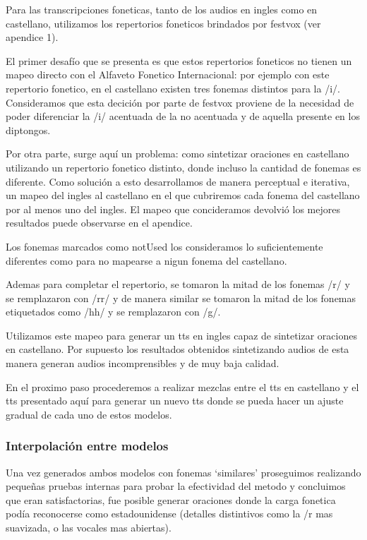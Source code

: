 
Para las transcripciones foneticas, tanto de los audios en ingles como en castellano, utilizamos los repertorios foneticos brindados por festvox (ver apendice 1).

El primer desafío que se presenta es que estos repertorios foneticos no tienen un mapeo directo con el Alfaveto Fonetico Internacional: por ejemplo con este repertorio fonetico, en el castellano existen tres fonemas distintos para la /i/. Consideramos que esta decición por parte de festvox proviene de la necesidad de poder diferenciar la /i/ acentuada de la no acentuada y de aquella presente en los diptongos. 

Por otra parte, surge aquí un problema: como sintetizar oraciones en castellano utilizando un repertorio fonetico distinto, donde incluso la cantidad de fonemas es diferente. Como solución a esto desarrollamos de manera perceptual e iterativa, un mapeo del ingles al castellano en el que cubriremos cada fonema del castellano por al menos uno del ingles. El mapeo que concideramos devolvió los mejores resultados puede observarse en el apendice.

Los fonemas marcados como notUsed los consideramos lo suficientemente diferentes como para no mapearse a nigun fonema del castellano.

Ademas para completar el repertorio, se tomaron la mitad de los fonemas /r/ y se remplazaron con /rr/ y de manera similar se tomaron la mitad de los fonemas etiquetados como /hh/ y se remplazaron con /g/.

Utilizamos este mapeo para generar un tts en ingles capaz de sintetizar oraciones en castellano. Por supuesto los resultados obtenidos sintetizando audios de esta manera generan audios incomprensibles y de muy baja calidad.

En el proximo paso procederemos a realizar mezclas entre el tts en castellano y el tts presentado aquí para generar un nuevo tts donde se pueda hacer un ajuste gradual de cada uno de estos modelos. 


\subsubsection{Interpolación entre modelos}

Una vez generados ambos modelos con fonemas `similares' proseguimos realizando pequeñas pruebas internas para probar la efectividad del metodo y concluimos que eran satisfactorias, fue posible generar oraciones donde la carga fonetica podía reconocerse como estadounidense (detalles distintivos como la /r mas suavizada, o las vocales mas abiertas).


